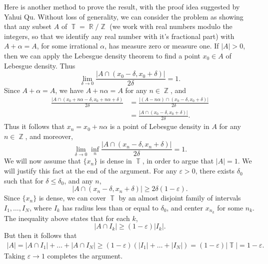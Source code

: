 \documentclass{exam}
\DeclareMathOperator{\RR}{\mathbb{R}}
\DeclareMathOperator{\ZZ}{\mathbb{Z}}
\DeclareMathOperator{\TT}{\mathbb{T}}
\theoremstyle{problemstyle}
\newcommand{\1}[1]{\textbf{1}_{\left[#1\right]}} %
\begin{document}
\begin{questions}
\begin{solution}
	Here is another method to prove the result, with the proof idea suggested by Yahui Qu. Without loss of generality, we can consider the problem as showing that any subset $A$ of $\TT = \RR / \ZZ$ (we work with real numbers modulo the integers, so that we identify any real number with it's fractional part) with $A + \alpha = A$, for some irrational $\alpha$, has measure zero or measure one. If $|A| > 0$, then we can apply the Lebesgue density theorem to find a point $x_0 \in A$ of Lebesgue density. Thus
	\[ \lim_{\delta \to 0} \frac{|A \cap (x_0 - \delta, x_0 + \delta)|}{2 \delta} = 1. \]
	Since $A + \alpha = A$, we have $A + n\alpha = A$ for any $n \in \ZZ$, and
	\begin{align*}
		\frac{|A \cap (x_0 + n \alpha - \delta, x_0 + n \alpha + \delta)}{2 \delta} &= \frac{|(A - n \alpha) \cap (x_0 - \delta, x_0 + \delta)|}{2 \delta}\\
		&= \frac{|A \cap (x_0 - \delta, x_0 + \delta)|}{2 \delta}.
	\end{align*}
	Thus it follows that $x_n = x_0 + n \alpha$ is a point of Lebesgue density in $A$ for any $n \in \ZZ$, and moreover,
	\[ \lim_{\delta \to 0} \inf_n \frac{|A \cap (x_n - \delta, x_n + \delta)|}{2 \delta} = 1. \]
	We will now assume that $\{ x_n \}$ is dense in $\TT$, in order to argue that $|A| = 1$. We will justify this fact at the end of the argument. For any $\varepsilon > 0$, there exists $\delta_0$ such that for $\delta \leq \delta_0$, and any $n$,
	\[  |A \cap (x_n - \delta, x_n + \delta)| \geq 2 \delta (1 - \varepsilon). \]
	Since $\{ x_n \}$ is dense, we can cover $\TT$ by an almost disjoint family of intervals $I_1,\dots,I_N$, where $I_k$ has radius less than or equal to $\delta_0$, and center $x_{n_k}$ for some $n_k$. The inequality above states that for each $k$,
	\[ |A \cap I_k| \geq (1 - \varepsilon) |I_k|. \]
	But then it follows that
	\begin{align*}
		|A| = |A \cap I_1| + \dots + |A \cap I_N| \geq (1 - \varepsilon) (|I_1| + \dots + |I_N|) = (1 - \varepsilon) |\TT| = 1 - \varepsilon.
	\end{align*}
	Taking $\varepsilon \to 1$ completes the argument.


\end{solution}
\end{questions}
\end{document}
